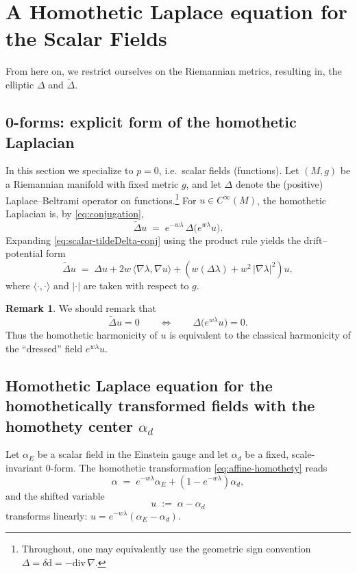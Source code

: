 \documentclass[preprint,12pt]{elsarticle}
\theoremstyle{plain}
\theoremstyle{definition}
\newtheorem{remark}[theorem]{Remark}
\theoremstyle{note}
\newcommand{\dd}{\mathrm{d}}
\newcommand{\grad}{\nabla}
\newcommand{\wtD}{\tilde\Delta}
\begin{document}
\section{A Homothetic Laplace equation for the Scalar Fields} \label{sec:scalar-pde}

From here on, we restrict ourselves on the Riemannian metrics, resulting in, the elliptic $\Delta$ and $\tilde{\Delta}$.
 
\subsection{0-forms: explicit form of the homothetic Laplacian}
In this section we specialize to $p=0$, i.e.\ scalar fields (functions).
Let $(M,g)$ be a Riemannian manifold with fixed metric $g$, and let $\Delta$ denote the (positive) Laplace--Beltrami operator on functions.\footnote{%
Throughout, one may equivalently use the geometric sign convention $\Delta=\delta\dd=-\mathrm{div}\,\grad$.} For $u\in C^\infty(M)$, the homothetic Laplacian is, by \eqref{eq:conjugation},
\begin{equation}\label{eq:scalar-tildeDelta-conj}
\wtD u \;=\; e^{-w\lambda}\,\Delta\!\big(e^{w\lambda}u\big).
\end{equation}
Expanding \eqref{eq:scalar-tildeDelta-conj} using the product rule yields the drift--potential form
\begin{equation}\label{eq:scalar-tildeDelta-expanded}
\wtD u \;=\; \Delta u + 2w\,\langle \grad\lambda,\grad u\rangle + \left(w(\Delta\lambda) + w^2\,|\grad\lambda|^2 \right)u,
\end{equation}
where $\langle\cdot,\cdot\rangle$ and $|\cdot|$ are taken with respect to $g$.

\begin{remark}\label{rem:div-form}
We should remark that 
\begin{equation}\label{eq:scalar-div-form}
\wtD u = 0
\qquad\Longleftrightarrow\qquad
\Delta\!\big(e^{w\lambda}u\big)=0.
\end{equation}
Thus the homothetic harmonicity of $u$ is equivalent to the classical harmonicity of the ``dressed'' field $e^{w\lambda}u$.
\end{remark}

\subsection{Homothetic Laplace equation for the homothetically transformed fields with the homothety center \texorpdfstring{$\alpha_d$}{alpha\_d}}
Let $\alpha_E$ be a scalar field in the Einstein gauge and let $\alpha_d$ be a fixed, scale-invariant $0$-form.
The homothetic transformation \eqref{eq:affine-homothety} reads
\begin{equation}\label{eq:scalar-affine}
\alpha \;=\; e^{-w\lambda}\alpha_E + (1-e^{-w\lambda})\alpha_d,
\end{equation}
and the shifted variable
\begin{equation}\label{eq:u-def}
u \;:=\; \alpha-\alpha_d
\end{equation}
transforms linearly: $u=e^{-w\lambda}(\alpha_E-\alpha_d)$.
\end{document}
